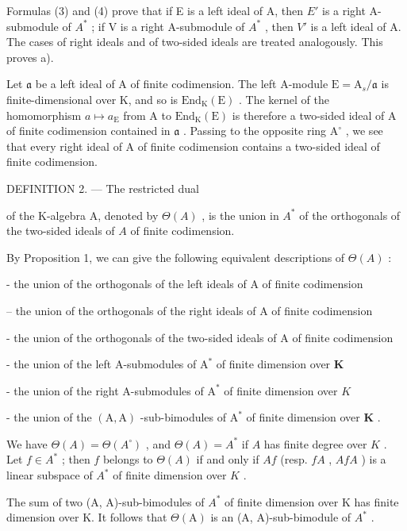 Formulas (3) and (4) prove that if E is a left ideal of A, then \(E'\) is a right A-submodule of \(A^{*}\) ; if V is a right A-submodule of \(A^{*}\) , then \(V'\) is a left ideal of A. The cases of right ideals and of two-sided ideals are treated analogously. This proves a).

Let \(\mathfrak{a}\) be a left ideal of A of finite codimension. The left A-module \(\mathrm{E} = \mathrm{A}_s / \mathfrak{a}\) is finite-dimensional over K, and so is \(\mathrm{End}_{\mathrm{K}}(\mathrm{E})\) . The kernel of the homomorphism \(a \mapsto a_{\mathrm{E}}\) from A to \(\mathrm{End}_{\mathrm{K}}(\mathrm{E})\) is therefore a two-sided ideal of A of finite codimension contained in \(\mathfrak{a}\) . Passing to the opposite ring \(\mathrm{A}^{\circ}\) , we see that every right ideal of A of finite codimension contains a two-sided ideal of finite codimension.

DEFINITION 2. --- The restricted dual

of the K-algebra A, denoted by \(\Theta(A)\) , is the union in \(A^{*}\) of the orthogonals of the two-sided ideals of \(A\) of finite codimension.

By Proposition 1, we can give the following equivalent descriptions of \(\Theta(A)\) :

- the union of the orthogonals of the left ideals of A of finite codimension

-- the union of the orthogonals of the right ideals of A of finite codimension

- the union of the orthogonals of the two-sided ideals of \(\mathrm{A}\) of finite codimension

- the union of the left A-submodules of \(\mathrm{A}^*\) of finite dimension over \(\mathbf{K}\)

- the union of the right A-submodules of \(\mathrm{A}^*\) of finite dimension over \(K\)

- the union of the \((\mathrm{A},\mathrm{A})\) -sub-bimodules of \(\mathrm{A}^*\) of finite dimension over \(\mathbf{K}\) .

We have \(\Theta(A) = \Theta(A^{\circ})\) , and \(\Theta(A) = A^{*}\) if \(A\) has finite degree over \(K\) . Let \(f \in A^{*}\) ; then \(f\) belongs to \(\Theta(A)\) if and only if \(Af\) (resp. \(fA\) , \(AfA\) ) is a linear subspace of \(A^{*}\) of finite dimension over \(K\) .

The sum of two (A, A)-sub-bimodules of \(A^{*}\) of finite dimension over K has finite dimension over K. It follows that \(\Theta(\mathrm{A})\) is an (A, A)-sub-bimodule of \(A^{*}\) .

